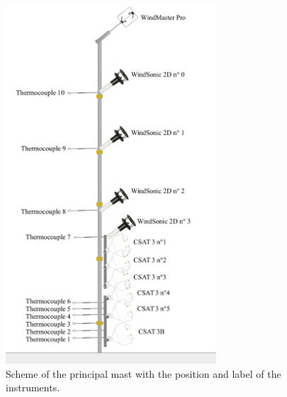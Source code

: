 \begin{figure}[!ht]
  \begin{center}
  \includegraphics[width=0.7\textwidth]{fig/chapter_3/Montage.jpg}
  \caption{Scheme of the principal mast with the position and label of the instruments.}
  \label{fig:mast}
  \end{center}
\end{figure}

